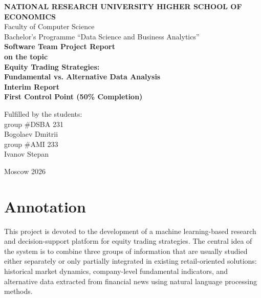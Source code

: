 \documentclass[12pt,a4paper]{article}
\begin{document}
\begin{titlepage}
    \begin{center}
        \textbf{NATIONAL RESEARCH UNIVERSITY HIGHER SCHOOL OF ECONOMICS}\\
        Faculty of Computer Science\\
        Bachelor's Programme ``Data Science and Business Analytics''\\[2cm]

        \textbf{\Large Software Team Project Report}\\[0.8cm]
        \textbf{on the topic}\\[0.4cm]

        \textbf{\LARGE Equity Trading Strategies:}\\
        \textbf{\LARGE Fundamental vs. Alternative Data Analysis}\\[0.8cm]

        \textbf{Interim Report}\\
        \textbf{First Control Point (50\% Completion)}\\[2cm]

        \begin{flushleft}
        Fulfilled by the students: \\
        group \#DSBA 231 \\
        Bogolaev Dmitrii \\[0.3cm]
        group \#AMI 233 \\
        Ivanov Stepan
        \end{flushleft}

        \vfill
        Moscow 2026
    \end{center}
\end{titlepage}

\tableofcontents
\newpage

\section{Annotation}

This project is devoted to the development of a machine learning-based research and decision-support platform for equity trading strategies. The central idea of the system is to combine three groups of information that are usually studied either separately or only partially integrated in existing retail-oriented solutions: historical market dynamics, company-level fundamental indicators, and alternative data extracted from financial news using natural language processing methods.
\end{document}
